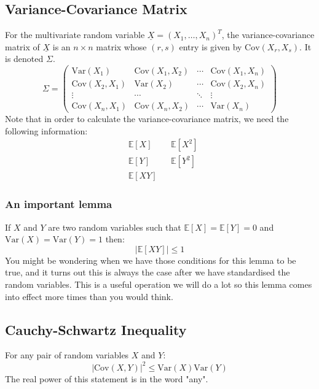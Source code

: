 \documentclass[12pt]{article}
\begin{document}
\subsection{Variance-Covariance Matrix}
For the multivariate random variable \(\underline{X}=(X_1,\dots,X_n)^T\), the variance-covariance matrix of \(\underline{X}\) is an \(n\times n\) matrix whose \((r,s)\) entry is given by \(\text{Cov}(X_r,X_s)\). It is denoted \(\Sigma\).
\[\Sigma=\begin{pmatrix}
    \text{Var}(X_1) & \text{Cov}(X_1,X_2) & \cdots & \text{Cov}(X_1,X_n) \\
    \text{Cov}(X_2,X_1) & \text{Var} (X_2) & \cdots & \text{Cov}(X_2,X_n) \\
    \vdots & \cdots & \ddots & \vdots \\
    \text{Cov}(X_n,X_1) & \text{Cov}(X_n, X_2) & \cdots & \text{Var}(X_n)
\end{pmatrix}\]
Note that in order to calculate the variance-covariance matrix, we need the following information:
\begin{align*}
    &\mathbb{E}[X] && \mathbb{E}[X^2] \\
    &\mathbb{E}[Y] && \mathbb{E}[Y^2] \\
    &\mathbb{E}[XY]
\end{align*}
\subsubsection{An important lemma}
If \(X\) and \(Y\) are two random variables such that \(\mathbb{E}[X]=\mathbb{E}[Y]=0\) and \(\text{Var}(X)=\text{Var}(Y)=1\) then:
\[|\mathbb{E}[XY]|\leq 1\]
You might be wondering when we have those conditions for this lemma to be true, and it turns out this is always the case after we have standardised the random variables. This is a useful operation we will do a lot so this lemma comes into effect more times than you would think.
\subsection{Cauchy-Schwartz Inequality}
For any pair of random variables \(X\) and \(Y\):
\[|\text{Cov}(X,Y)|^2\leq \text{Var}(X)\text{Var}(Y)\]
The real power of this statement is in the word "any".
\end{document}
